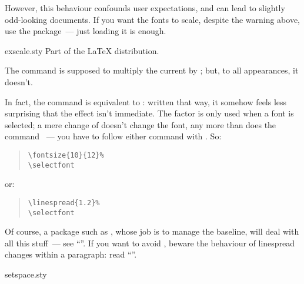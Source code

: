 However, this behaviour confounds user expectations, and can lead to
slightly odd-looking documents.  If you want the fonts to scale,
despite the warning above, use the  package~--- just
loading it is enough.
\begin{ctanrefs}
\item[exscale.sty]Part of the \LaTeX{} distribution.
\end{ctanrefs}


The command  is supposed to multiply
the current  by ; but, to all
appearances, it doesn't.

In fact, the command is equivalent to
: written that
way, it somehow feels less surprising that the effect isn't immediate.
The  factor is only used when a font is selected;
a mere change of  doesn't change the font, any
more than does the command
~--- you have to follow
either command with .  So:
\begin{quote}
\begin{verbatim}
\fontsize{10}{12}%
\selectfont
\end{verbatim}
\end{quote}
or:
\begin{quote}
\begin{verbatim}
\linespread{1.2}%
\selectfont
\end{verbatim}
\end{quote}
Of course, a package such as , whose job is to
manage the baseline, will deal with all this stuff~--- see
``''.  If
you want to avoid , beware the behaviour of
linespread changes within a paragraph: read %
``''.
\begin{ctanrefs}
\item[setspace.sty]
\end{ctanrefs}


